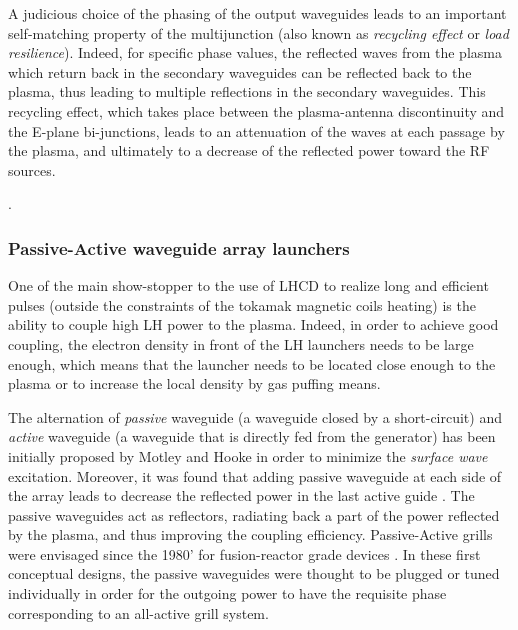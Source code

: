 {A judicious choice of the phasing of the output waveguides leads to an important self-matching property of the multijunction (also known as \emph{recycling effect} or \emph{load resilience}). Indeed, for specific phase values, the reflected waves from the plasma which return back in the secondary waveguides can be reflected back to the plasma, thus leading to multiple reflections in the secondary waveguides. This recycling effect, which takes place between the plasma-antenna discontinuity and the E-plane bi-junctions, leads to an attenuation of the waves at each passage by the plasma, and ultimately to a decrease of the reflected power toward the RF sources. 

.



\subsubsection{Passive-Active waveguide array launchers}
One of the main show-stopper to the use of LHCD to realize long and efficient pulses (outside the constraints of the tokamak magnetic coils heating) is the ability to couple high LH power to the plasma. Indeed, in order to achieve good coupling, the electron density in front of the LH launchers needs to be large enough, which means that the launcher needs to be located close enough to the plasma or to increase the local density by gas puffing means. 

The alternation of \emph{passive} waveguide (a waveguide closed by a short-circuit) and \emph{active} waveguide (a waveguide that is directly fed from the generator) has been initially proposed by Motley and Hooke  in order to minimize the \emph{surface wave} excitation. Moreover, it was found that adding passive waveguide at each side of the array leads to decrease the reflected power in the last active guide . The passive waveguides act as reflectors, radiating back a part of the power reflected by the plasma, and thus improving the coupling efficiency. Passive-Active grills were envisaged since the 1980' for fusion-reactor grade devices . In these first conceptual designs, the passive waveguides were thought to be plugged or tuned individually in order for the outgoing power to have the requisite phase corresponding to an all-active grill system. 

}
